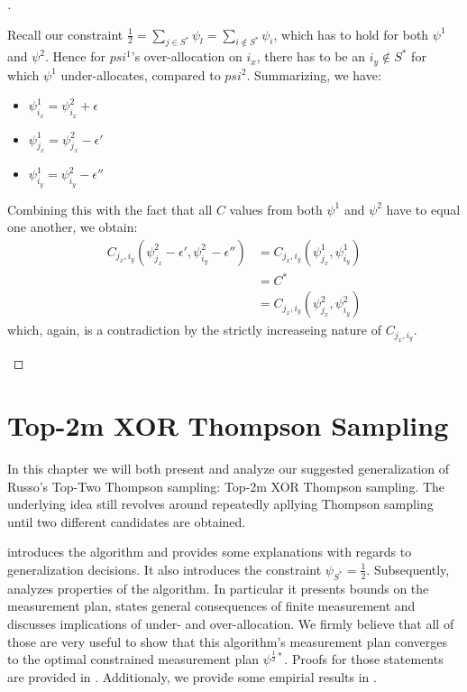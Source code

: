 \begin{proof}[]
\begin{enumerate}[(i)]
\begin{itemize}
      Recall our constraint $\frac{1}{2} = \sum_{j \in S^*} \psi_l = \sum_{i \notin S^*} \psi_i$, which has to hold for both $\psi^1$ and $\psi^2$.
      Hence for $psi^1$'s over-allocation on $i_x$, there has to be an $i_y \notin S^*$ for which $\psi^1$ under-allocates, compared to $psi^2$.
      Summarizing, we have:
      \begin{itemize}
        \item $\psi^1_{i_x} = \psi^2_{i_x} + \epsilon$
        \item $\psi^1_{j_x} = \psi^2_{j_x} - \epsilon'$
        \item $\psi^1_{i_y} = \psi^2_{i_y} - \epsilon''$
      \end{itemize}
      Combining this with the fact that all $C$ values from both $\psi^1$ and $\psi^2$ have to equal one another, we obtain:
      \begin{align}
        C_{j_x, i_y}(\psi^2_{j_x} - \epsilon', \psi^2_{i_y} - \epsilon'') &= C_{j_x, i_y}(\psi^1_{j_x}, \psi^1_{i_y}) \\
        &= C^* \\
        &= C_{j_x, i_y}(\psi^2_{j_x}, \psi^2_{i_y})
      \end{align}
      which, again, is a contradiction by the strictly increaseing nature of $C_{j_x, i_y}$.
    \end{itemize}
  \end{enumerate}
\end{proof}

\chapter{Top-2m XOR Thompson Sampling}

In this chapter we will both present and analyze our suggested generalization of Russo's Top-Two Thompson sampling: Top-2m XOR Thompson sampling. The underlying idea still revolves around repeatedly apllying Thompson sampling until two different candidates are obtained.

 introduces the algorithm and provides some explanations with regards to generalization decisions. It also introduces the constraint $\psi_{S^*} = \frac{1}{2}$. Subsequently,  analyzes properties of the algorithm. In particular it presents bounds on the measurement plan, states general consequences of finite measurement and discusses implications of under- and over-allocation. We firmly believe that all of those are very useful to show that this algorithm's measurement plan converges to the optimal constrained measurement plan $\psi^{\frac{1}{2}*}$. Proofs for those statements are provided in . Additionaly, we provide some empirial results in .

